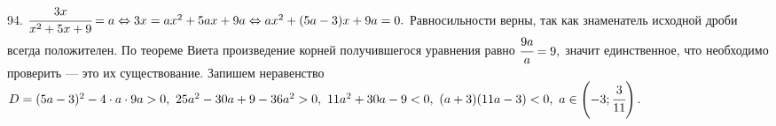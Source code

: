 94. $\cfrac{3x}{x^2+5x+9}=a \Leftrightarrow 3x=ax^2+5ax+9a
\Leftrightarrow ax^2+(5a-3)x+9a=0.$ Равносильности верны, так как знаменатель исходной дроби всегда положителен. По теореме Виета произведение корней получившегося уравнения равно $\cfrac{9a}{a}=9,$ значит единственное, что необходимо проверить --- это их существование. Запишем неравенство
$D=(5a-3)^2-4\cdot a\cdot9a> 0,\ 25a^2-30a+9-36a^2>0,\
11a^2+30a-9< 0,\ (a+3)(11a-3)< 0,\ a\in\left(-3;\cfrac{3}{11}\right).$
\newpage
